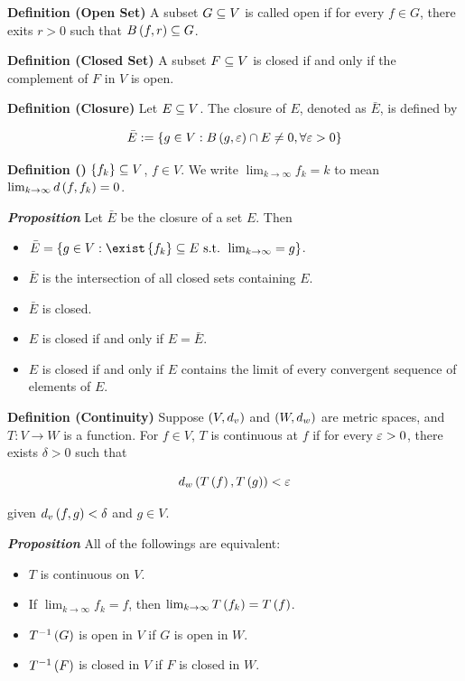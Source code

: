 \documentclass[
]{article}
\begin{document}
\textbf{Definition (Open Set)} A subset \(G\subseteq V\) is called open if for
every \(f\in G\), there exits \(r>0\) such that \(B\left(f,r\right)\subseteq G\).

\textbf{Definition (Closed Set)} A subset \(F\subseteq V\) is closed if and
only if the complement of \(F\) in \(V\) is open.

\textbf{Definition (Closure)} Let \(E\subseteq V\). The closure of \(E\),
denoted as \(\bar E\), is defined by

\[\bar E:=\left\{g\in V:B\left(g,\varepsilon\right)\cap E\ne 0,\forall \varepsilon>0\right\}\]

\textbf{Definition ()} \(\left\{f_k\right\}\subseteq V\), \(f\in V\). We write
\(\lim_{k\to \infty}f_k = k\) to mean
\(\lim_{k\to\infty}d\left(f,f_k\right) = 0\).

\emph{\textbf{Proposition}} Let \(\bar E\) be the closure of a set
\(E\). Then

\begin{itemize}
\item
  \(\bar E = \brace{g\in V:\exist \brace{f_k}\se E \st \lim_{k\to\infty} = g}\).
\item
  \(\bar E\) is the intersection of all closed sets containing \(E\).
\item
  \(\bar E\) is closed.
\item
  \(E\) is closed if and only if \(E = \bar E\).
\item
  \(E\) is closed if and only if \(E\) contains the limit of every
  convergent sequence of elements of \(E\).
\end{itemize}

\textbf{Definition (Continuity)} Suppose \(\left(V,d_v\right)\) and
\(\left(W,d_w\right)\) are metric spaces, and \(T:V\to W\) is a function. For
\(f\in V\), \(T\) is continuous at \(f\) if for every \(\varepsilon>0\), there
exists \(\delta>0\) such that

\[d_w\left(T\left(f\right),T\left(g\right)\right)<\varepsilon\]

given \(d_v\left(f,g\right)<\delta\) and \(g\in V\).

\emph{\textbf{Proposition}} All of the followings are equivalent:

\begin{itemize}
\item
  \(T\) is continuous on \(V\).
\item
  If \(\lim_{k\to\infty} f_k = f\), then
  \(\lim_{k\to\infty}T\left(f_k\right) = T\left(f\right)\).
\item
  \({T}^{-1}\left(G\right)\) is open in \(V\) if \(G\) is open in \(W\).
\item
  \({T}^{-1}\left(F\right)\) is closed in \(V\) if \(F\) is closed in \(W\).
\end{itemize}
\end{document}
